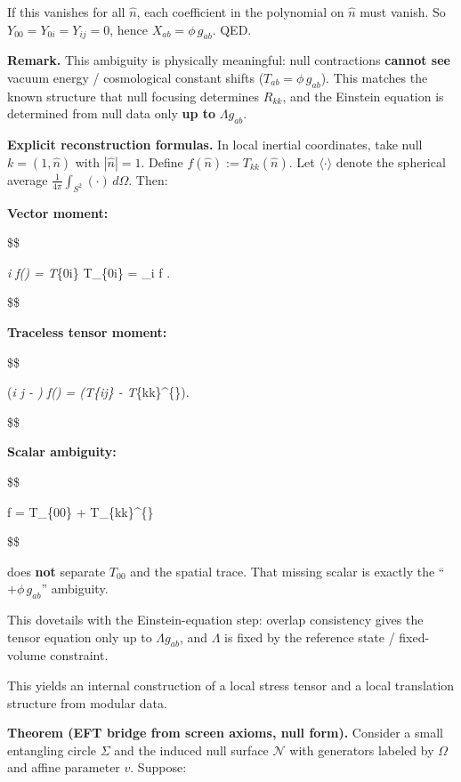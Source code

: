 \documentclass[11pt,a4paper]{article}
\theoremstyle{remark}
\begin{document}
If this vanishes for all \(\hat{n}\), each coefficient in the polynomial on
\(\hat{n}\) must vanish. So \(Y_{00} = Y_{0i} = Y_{ij} = 0\), hence
\(X_{ab} = \phi \, g_{ab}\). QED.

\textbf{Remark.} This ambiguity is physically meaningful: null contractions
\textbf{cannot see} vacuum energy / cosmological constant shifts
(\(T_{ab} = \phi \, g_{ab}\)). This matches the known structure that null
focusing determines \(R_{kk}\), and the Einstein equation is determined from
null data only \textbf{up to} \(\Lambda g_{ab}\).

\textbf{Explicit reconstruction formulas.} In local inertial coordinates, take
null \(k = (1, \hat{n})\) with \(|\hat{n}| = 1\). Define \(f(\hat{n}) := T_{kk}(\hat{n})\).
Let \(\langle \cdot \rangle\) denote the spherical average
\(\frac{1}{4\pi} \int_{S^2} (\cdot) \, d\Omega\). Then:

\textbf{Vector moment:}

\$\$

\langle {}\emph{i f() \rangle =  T}\{0i\}
\quad \Rightarrow \quad
T\_\{0i\} =  \langle {}\_i f \rangle.

\$\$

\textbf{Traceless tensor moment:}

\$\$

\left\langle \left(\emph{i \emph{j - \right) f() \right\rangle
=  \left(T}\{ij\} -  T}\{kk\}\^{}\{\}\right).

\$\$

\textbf{Scalar ambiguity:}

\$\$

\langle f \rangle = T\_\{00\} +  T\_\{kk\}\^{}\{\}

\$\$

does \textbf{not} separate \(T_{00}\) and the spatial trace. That missing scalar
is exactly the ``\(+ \phi \, g_{ab}\)'' ambiguity.

This dovetails with the Einstein-equation step: overlap consistency gives
the tensor equation only up to \(\Lambda g_{ab}\), and \(\Lambda\) is fixed by
the reference state / fixed-volume constraint.

This yields an internal construction of a local stress tensor and a local
translation structure from modular data.

\textbf{Theorem (EFT bridge from screen axioms, null form).} Consider a small
entangling circle \(\Sigma\) and the induced null surface \(\mathcal{N}\) with
generators labeled by \(\Omega\) and affine parameter \(v\). Suppose:
\end{document}
